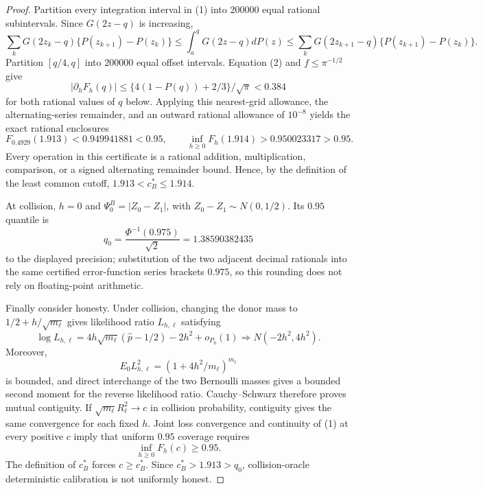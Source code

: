 \documentclass{article}
\begin{document}
\begin{proof}
Partition every integration interval in (1) into \(200000\) equal rational subintervals.  Since \(G(2z-q)\) is increasing,
\[
 \sum_kG(2z_k-q)\{P(z_{k+1})-P(z_k)\}
 \leq\int_a^qG(2z-q)dP(z)
 \leq\sum_kG(2z_{k+1}-q)\{P(z_{k+1})-P(z_k)\}.
\]
Partition \([q/4,q]\) into \(200000\) equal offset intervals.  Equation (2) and \(f\leq\pi^{-1/2}\) give
\[
 |\partial_hF_h(q)|
 \leq\{4(1-P(q))+2/3\}/\sqrt\pi<0.384
\]
for both rational values of \(q\) below.  Applying this nearest-grid allowance, the alternating-series remainder, and an outward rational allowance of \(10^{-8}\) yields the exact rational enclosures
\[
 F_{0.4929}(1.913)<0.949941881<0.95,
 \qquad
 \inf_{h\geq0}F_h(1.914)>0.950023317>0.95.
\]
Every operation in this certificate is a rational addition, multiplication, comparison, or a signed alternating remainder bound.  Hence, by the definition of the least common cutoff,
\(1.913<c_B^*\leq1.914\).

At collision, \(h=0\) and \(\Psi^B_0=|Z_0-Z_1|\), with
\(Z_0-Z_1\sim N(0,1/2)\).  Its \(0.95\) quantile is
\[
 q_0=\frac{\Phi^{-1}(0.975)}{\sqrt2}
 =1.38590382435
\]
to the displayed precision; substitution of the two adjacent decimal rationals into the same certified error-function series brackets \(0.975\), so this rounding does not rely on floating-point arithmetic.

Finally consider honesty.  Under collision, changing the donor mass to
\(1/2+h/\sqrt{m_\ell}\) gives likelihood ratio \(L_{h,\ell}\) satisfying
\[
 \log L_{h,\ell}
 =4h\sqrt{m_\ell}(\widehat p-1/2)-2h^2+o_{P_0}(1)
 \Rightarrow N(-2h^2,4h^2).
\]
Moreover,
\[
 E_0L_{h,\ell}^2=(1+4h^2/m_\ell)^{m_\ell}
\]
is bounded, and direct interchange of the two Bernoulli masses gives a bounded second moment for the reverse likelihood ratio.  Cauchy--Schwarz therefore proves mutual contiguity.  If
\(\sqrt{m_\ell}R_\ell^2\to c\) in collision probability, contiguity gives the same convergence for each fixed \(h\).  Joint loss convergence and continuity of (1) at every positive \(c\) imply that uniform \(0.95\) coverage requires
\[
 \inf_{h\geq0}F_h(c)\geq0.95.
\]
The definition of \(c_B^*\) forces \(c\geq c_B^*\).  Since
\(c_B^*>1.913>q_0\), collision-oracle deterministic calibration is not uniformly honest.
\end{proof}
\end{document}
